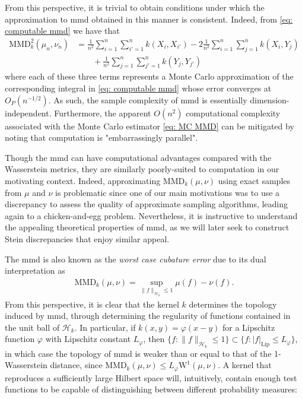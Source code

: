 \documentclass[12pt,paper=letter]{scrreprt}
\begin{document}
From this perspective, it is trivial to obtain conditions under which the approximation to \ac{mmd} obtained in this manner is consistent.
Indeed, from \eqref{eq: computable mmd} we have that
\begin{align}
    \mathrm{MMD}_k^2(\mu_n,\nu_n) & = \frac{1}{n^2} \sum_{i=1}^n \sum_{i'=1}^n k(X_i,X_{i'}) - 2 \frac{1}{n^2} \sum_{i=1}^n \sum_{j=1}^n k(X_i,Y_j) \nonumber \\
    & \qquad + \frac{1}{n^2} \sum_{j=1}^n \sum_{j'=1}^n k(Y_j,Y_{j'}) \label{eq: MC MMD}
\end{align}
where each of these three terms represents a Monte Carlo approximation of the corresponding integral in \eqref{eq: computable mmd} whose error converges at $O_P(n^{-1/2})$.
As such, the sample complexity of \ac{mmd} is essentially dimension-independent.
Furthermore, the apparent $O(n^2)$ computational complexity associated with the Monte Carlo estimator \eqref{eq: MC MMD} can be mitigated by noting that computation is "embarrassingly parallel".

Though the \ac{mmd} can have computational advantages compared with the Wasserstein metrics, they are similarly poorly-suited to computation in our motivating context.
Indeed, approximating $\mathrm{MMD}_k(\mu,\nu)$ using exact samples from $\mu$ and $\nu$ is problematic since one of our main motivations was to use a discrepancy to assess the quality of approximate sampling algorithms, leading again to a chicken-and-egg problem.
Nevertheless, it is instructive to understand the appealing theoretical properties of \ac{mmd}, as we will later seek to construct Stein discrepancies that enjoy similar appeal.


The \ac{mmd} is also known as the \emph{worst case cubature error} due to its dual interpretation as
\begin{align}
    \mathrm{MMD}_k(\mu,\nu) = \sup_{\|f\|_{\mathcal{H}_k} \leq 1} \mu(f) - \nu(f) .  \label{eq: MMD as WCE}
\end{align}
From this perspective, it is clear that the kernel $k$ determines the topology induced by \ac{mmd}, through determining the regularity of functions contained in the unit ball of $\mathcal{H}_k$.
In particular, if $k(x,y) = \varphi(x-y)$ for a Lipschitz function $\varphi$ with Lipschitz constant $L_\varphi$, then $\{f : \|f\|_{\mathcal{H}_k} \leq 1 \} \subset \{f : |f|_{\text{Lip}} \leq L_\varphi \}$, in which case the topology of \ac{mmd} is weaker than or equal to that of the 1-Wasserstein distance, since $\mathrm{MMD}_k(\mu,\nu) \leq L_\varphi \mathrm{W}^1(\mu,\nu)$. 
A kernel that reproduces a sufficiently large Hilbert space will, intuitively, contain enough test functions to be capable of distinguishing between different probability measures:
\end{document}
